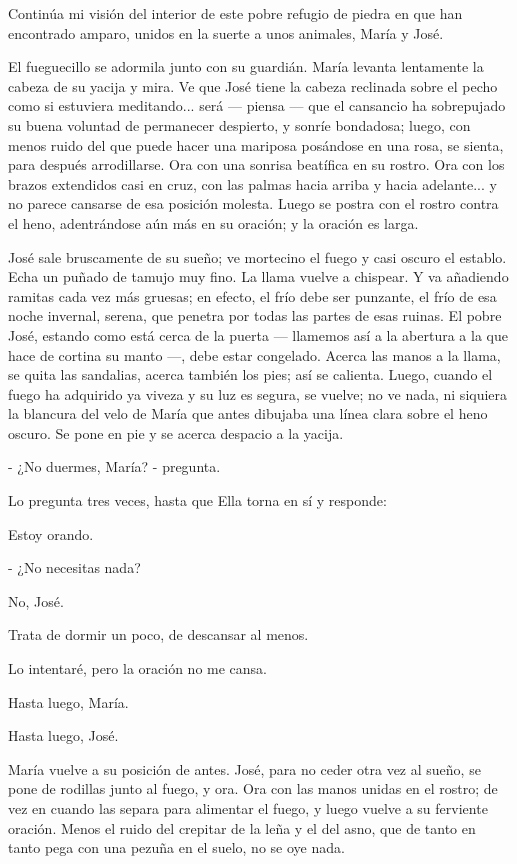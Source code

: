 \documentclass[12pt, twoside, openright]{book} %
\begin{document}
Continúa mi visión del interior de este pobre refugio de piedra en que han encontrado amparo, unidos en la suerte a  unos animales, María y José. 

El fueguecillo se adormila junto con su guardián. María levanta lentamente la cabeza de su yacija y mira. Ve que José tiene la cabeza reclinada sobre el pecho como si estuviera meditando... será — piensa — que el cansancio ha sobrepujado su buena voluntad de permanecer despierto, y sonríe bondadosa; luego, con menos ruido del que puede hacer una mariposa posándose en una rosa, se sienta, para después arrodillarse. Ora con una sonrisa beatífica en su rostro. Ora con los brazos extendidos casi en cruz, con las palmas hacia arriba y hacia adelante... y no parece cansarse de esa posición molesta. Luego se postra con el rostro contra el heno, adentrándose aún más en su oración; y la oración es larga. 

José sale bruscamente de su sueño; ve mortecino el fuego y casi oscuro el establo. Echa un puñado de tamujo muy fino. La llama vuelve a chispear. Y va añadiendo ramitas cada vez más gruesas; en efecto, el frío debe ser punzante, el frío de esa noche invernal, serena, que penetra por todas las partes de esas ruinas. El pobre José, estando como está cerca de la puerta — llamemos así a la abertura a la que hace de cortina su manto —, debe estar congelado. Acerca las manos a la llama, se quita las sandalias, acerca también los pies; así se calienta. Luego, cuando el fuego ha adquirido ya viveza y su luz es segura, se vuelve; no ve nada, ni siquiera la blancura del velo de María que antes dibujaba una línea clara sobre el heno oscuro. Se pone en pie y se acerca despacio a la yacija. 

- ¿No duermes, María? - pregunta. 

Lo pregunta tres veces, hasta que Ella torna en sí y responde: 

Estoy orando. 

- ¿No necesitas nada? 

No, José. 

Trata de dormir un poco, de descansar al menos. 

Lo intentaré, pero la oración no me cansa. 

Hasta luego, María. 

Hasta luego, José. 

María vuelve a su posición de antes. José, para no ceder otra vez al sueño, se pone de rodillas junto al fuego, y ora. Ora con las manos unidas en el rostro; de vez en cuando las separa para alimentar el fuego, y luego vuelve a su ferviente oración. Menos el ruido del crepitar de la leña y el del asno, que de tanto en tanto pega con una pezuña en el suelo, no se oye nada. 
\end{document}
